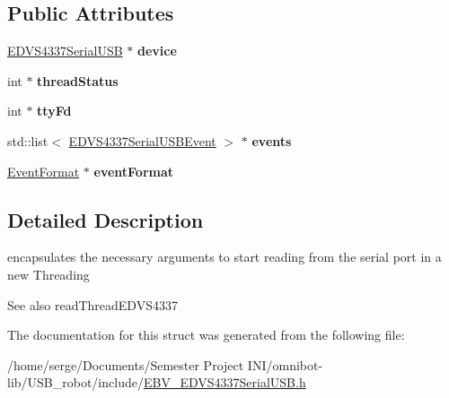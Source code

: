 \subsection*{Public Attributes}
\begin{DoxyCompactItemize}
\item 
\hypertarget{struct_e_d_v_s4337_serial_u_s_b_args_a817d919c3ff1a29b968011757857a27c}{}\hyperlink{class_e_d_v_s4337_serial_u_s_b}{E\+D\+V\+S4337\+Serial\+U\+S\+B} $\ast$ {\bfseries device}\label{struct_e_d_v_s4337_serial_u_s_b_args_a817d919c3ff1a29b968011757857a27c}

\item 
\hypertarget{struct_e_d_v_s4337_serial_u_s_b_args_aae8bd4bb2c628a16cbed119fd405406c}{}int $\ast$ {\bfseries thread\+Status}\label{struct_e_d_v_s4337_serial_u_s_b_args_aae8bd4bb2c628a16cbed119fd405406c}

\item 
\hypertarget{struct_e_d_v_s4337_serial_u_s_b_args_a351b7fc5f36a61597cc36139e4cabf81}{}int $\ast$ {\bfseries tty\+Fd}\label{struct_e_d_v_s4337_serial_u_s_b_args_a351b7fc5f36a61597cc36139e4cabf81}

\item 
\hypertarget{struct_e_d_v_s4337_serial_u_s_b_args_aaef561e6facb2a8f495d509f262b3e0b}{}std\+::list$<$ \hyperlink{struct_e_d_v_s4337_serial_u_s_b_event}{E\+D\+V\+S4337\+Serial\+U\+S\+B\+Event} $>$ $\ast$ {\bfseries events}\label{struct_e_d_v_s4337_serial_u_s_b_args_aaef561e6facb2a8f495d509f262b3e0b}

\item 
\hypertarget{struct_e_d_v_s4337_serial_u_s_b_args_a4f446a992e08e47a9ef9c6ebf2199bcc}{}\hyperlink{_e_b_v___e_d_v_s4337_serial_u_s_b_8h_a2b0bc356728b430ea3809f44d9be46c1}{Event\+Format} $\ast$ {\bfseries event\+Format}\label{struct_e_d_v_s4337_serial_u_s_b_args_a4f446a992e08e47a9ef9c6ebf2199bcc}

\end{DoxyCompactItemize}


\subsection{Detailed Description}
encapsulates the necessary arguments to start reading from the serial port in a new Threading 

\begin{DoxySeeAlso}{See also}
read\+Thread\+E\+D\+V\+S4337 
\end{DoxySeeAlso}


The documentation for this struct was generated from the following file\+:\begin{DoxyCompactItemize}
\item 
/home/serge/\+Documents/\+Semester Project I\+N\+I/omnibot-\/lib/\+U\+S\+B\+\_\+robot/include/\hyperlink{_e_b_v___e_d_v_s4337_serial_u_s_b_8h}{E\+B\+V\+\_\+\+E\+D\+V\+S4337\+Serial\+U\+S\+B.\+h}\end{DoxyCompactItemize}
